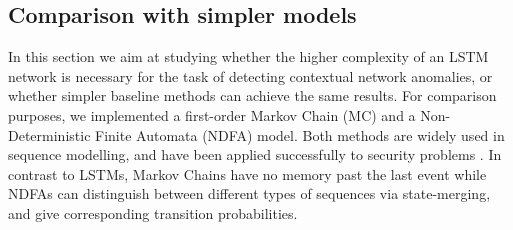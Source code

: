 \subsection{Comparison with simpler models}\label{Sect:Compsimp}

In this section we aim at studying whether the higher complexity of an LSTM network is necessary for the task of detecting contextual network anomalies, or whether simpler baseline methods can achieve the same results. For comparison purposes, we implemented a first-order Markov Chain (MC) and a Non-Deterministic Finite  Automata (NDFA) model. Both methods are widely used in sequence modelling, and have been applied successfully to security problems \cite{ye2000markov,pellegrino2017learning}. In contrast to LSTMs, Markov Chains have no memory past the last event while NDFAs can distinguish between different types of sequences via state-merging, and give corresponding transition probabilities.

